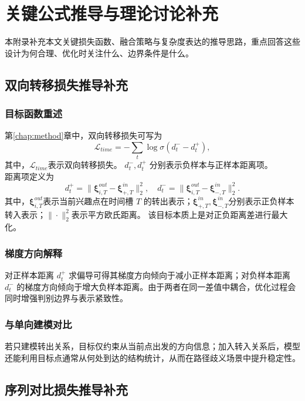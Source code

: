 \chapter{关键公式推导与理论讨论补充}
\label{appx:derivation}

本附录补充本文关键损失函数、融合策略与复杂度表达的推导思路，重点回答这些设计为何合理、优化时关注什么、边界条件是什么。

\section{双向转移损失推导补充}
\subsection{目标函数重述}
第\ref{chap:method}章中，双向转移损失可写为
\begin{equation}
\mathcal{L}_{time}=-\sum_t \log\sigma\left(d^-_t-d^+_t\right),
\end{equation}
其中，$\mathcal{L}_{time}$表示双向转移损失。
$d^-_t,d^+_t$ 分别表示负样本与正样本距离项。\\
距离项定义为
\begin{equation}
d^+_t=\|\boldsymbol{\xi}^{out}_{i,T}-\boldsymbol{\xi}^{in}_{+,T}\|_2^2,\quad
d^-_t=\|\boldsymbol{\xi}^{out}_{i,T}-\boldsymbol{\xi}^{in}_{-,T}\|_2^2.
\end{equation}
其中，$\boldsymbol{\xi}^{out}_{i,T}$表示当前兴趣点在时间槽 $T$ 的转出表示；$\boldsymbol{\xi}^{in}_{+,T},\boldsymbol{\xi}^{in}_{-,T}$分别表示正负样本转入表示；$\|\cdot\|_2^2$表示平方欧氏距离。
该目标本质上是对正负距离差进行最大化。

\subsection{梯度方向解释}
对正样本距离 $d^+_t$ 求偏导可得其梯度方向倾向于减小正样本距离；对负样本距离 $d^-_t$ 的梯度方向倾向于增大负样本距离。由于两者在同一差值中耦合，优化过程会同时增强判别边界与表示紧致性。

\subsection{与单向建模对比}
若只建模转出关系，目标仅约束从当前点出发的方向信息；加入转入关系后，模型还能利用目标点通常从何处到达的结构统计，从而在路径歧义场景中提升稳定性。

\section{序列对比损失推导补充}
